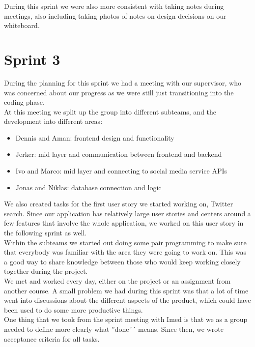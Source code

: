 During this sprint we were also more consistent with taking notes during
meetings, also including taking photos of notes on design decisions on our
whiteboard.

\section{Sprint 3}
During the planning for this sprint we had a meeting with our supervisor, who
was concerned about our progress as we were still just transitioning into the
coding phase. \\
At this meeting we split up the group into different subteams, and the
development into different areas:
\begin{itemize}
  \item Dennis and Aman: frontend design and functionality
  \item Jerker: mid layer and communication between frontend and backend
  \item Ivo and Marco: mid layer and connecting to social media service APIs
  \item Jonas and Niklas: database connection and logic
\end{itemize}

We also created tasks for the first user story we started working on, Twitter
search. Since our application has relatively large user stories and centers
around a few features that involve the whole application, we worked on this user
story in the following sprint as well. \\

Within the subteams we started out doing some pair programming to make sure that
everybody was familiar with the area they were going to work on. This was a good
way to share knowledge between those who would keep working closely together
during the project. \\

We met and worked every day, either on the project or an assignment from another
course. A small problem we had during this sprint was that a lot of time went
into discussions about the different aspects of the product, which could have
been used to do some more productive things. \\

One thing that we took from the sprint meeting with Imed is that we as a group
needed to define more clearly what ''done´´ means. Since then, we wrote
acceptance criteria for all tasks. \\

